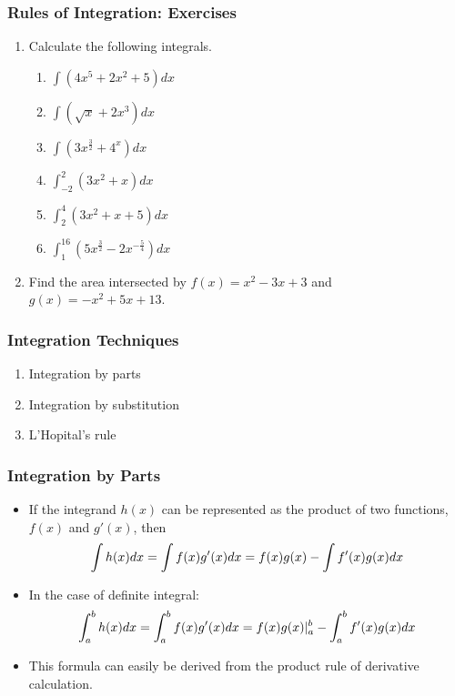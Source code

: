 \documentclass[pdflatex, 12pt]{beamer}
\begin{document}
\begin{frame}
\frametitle{Rules of Integration: Exercises}
\begin{enumerate}
\item Calculate the following integrals.
 \begin{enumerate}
 \item $\int (4x^5 + 2x^2 + 5)dx$
 \item $\int (\sqrt{x} + 2x^3)dx$
 \item $\int (3x^{\frac{3}{2}} + 4^{x})dx$
 \item $\int^2_{-2} (3x^2 + x)dx$
 \item $\int^4_2 (3x^2 + x + 5)dx$
 \item $\int^{16}_1 (5x^{\frac{3}{2}} - 2x^{-\frac{5}{4}})dx$
 \end{enumerate}
\vspace{0.4cm}
\item Find the area intersected by $f(x) = x^2 - 3x + 3$ and $g(x) = -x^2 + 5x + 13$.
\end{enumerate}
\end{frame}

\begin{frame}
\frametitle{Integration Techniques}
\begin{enumerate}
\item Integration by parts
\vspace{0.4cm}
\item Integration by substitution
\vspace{0.4cm}
\item L'Hopital's rule
\end{enumerate}
\end{frame}

\begin{frame}
\frametitle{Integration by Parts}
\begin{itemize}
\item If the integrand $h(x)$ can be represented as the product of two functions, $f(x)$ and $g'(x)$, then 
 \begin{equation}
 \int h(x) dx = \int f(x)g'(x) dx = f(x)g(x) - \int f'(x)g(x) dx \notag
 \end{equation} 
\item In the case of definite integral:
 \begin{equation}
 \int^b_a h(x) dx = \int^b_a f(x)g'(x) dx = f(x)g(x)|^b_a - \int^b_a f'(x)g(x) dx \notag
 \end{equation} 
\item This formula can easily be derived from the product rule of derivative calculation.
\end{itemize}
\end{frame}
\end{document}
